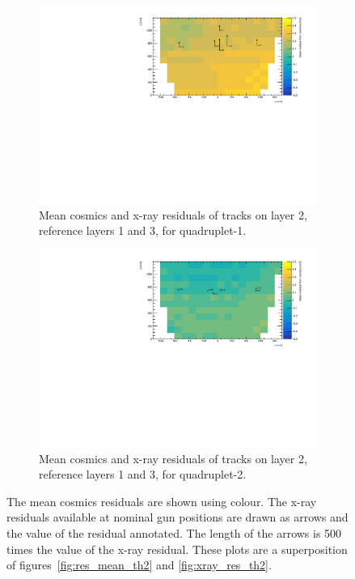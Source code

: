 \newpage
\thispagestyle{empty}
\begin{figure}
\centering
\begin{subfigure}{\textwidth}
  \centering
  \includegraphics[width=\linewidth]{figures/QL2P11_compare_residuals_th2_layer2_fixedlayers13.pdf}
  \caption{Mean cosmics and x-ray residuals of tracks on layer 2, reference layers 1 and 3, for quadruplet-1.}
  \label{fig:res_compare_th2_ql2p11}
\end{subfigure}%
\vspace*{\floatsep}
\begin{subfigure}{\textwidth}
  \centering
  \includegraphics[width=\linewidth]{figures/QL2P08_compare_residuals_th2_layer2_fixedlayers13.pdf}
  \caption{Mean cosmics and x-ray residuals of tracks on layer 2, reference layers 1 and 3, for quadruplet-2.}
  \label{fig:res_compare_th2_ql2p8}
\end{subfigure}
\caption{The mean cosmics residuals are shown using colour. The x-ray residuals available at nominal gun positions are drawn as arrows and the value of the residual annotated. The length of the arrows is 500 times the value of the x-ray residual. These plots are a superposition of figures~\ref{fig:res_mean_th2} and \ref{fig:xray_res_th2}.}
\label{fig:res_compare_th2}
\end{figure}
\newpage
\restoregeometry


